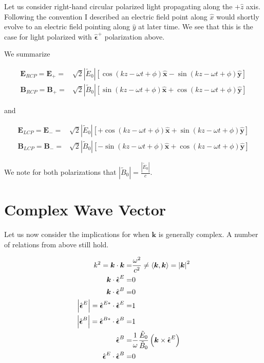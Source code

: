 \documentclass[12pt]{article}
\newcommand{\ep}{\epsilon}
\renewcommand{\vec}[1]{\boldsymbol{#1}}
\newcommand{\unitvec}[1]{\hat{\boldsymbol{#1}}}
\begin{document}
Let us consider right-hand circular polarized light propagating along the $+\hat{z}$ axis.
Following the convention I described an electric field point along $\hat{x}$ would shortly evolve to an electric field pointing along $\hat{y}$ at later time.
We see that this is the case for light polarized with $\unitvec{\ep}^+$ polarization above.

We summarize

\begin{align}
\vec{E}_{RCP} = \vec{E}_+ =& \sqrt{2}|\tilde{E}_0|\left[\cos(kz-\omega t + \phi) \unitvec{x} - \sin(kz-\omega t + \phi)\unitvec{y}\right]\\
\vec{B}_{RCP} = \vec{B}_+ =& \sqrt{2}|\tilde{B}_0|\left[\sin(kz-\omega t + \phi) \unitvec{x} + \cos(kz-\omega t + \phi)\unitvec{y}\right]
\end{align}

and

\begin{align}
\vec{E}_{LCP} = \vec{E}_- =& \sqrt{2}|\tilde{E}_0|\left[+\cos(kz-\omega t + \phi) \unitvec{x} + \sin(kz-\omega t + \phi)\unitvec{y}\right]\\
\vec{B}_{LCP} = \vec{B}_- =& \sqrt{2}|\tilde{B}_0|\left[-\sin(kz-\omega t + \phi) \unitvec{x} + \cos(kz-\omega t + \phi)\unitvec{y}\right]
\end{align}

We note for both polarizations that $|\tilde{B}_0| = \frac{|\tilde{E}_0|}{c}$.

\section{Complex Wave Vector}

Let us now consider the implications for when $\vec{k}$ is generally complex.
A number of relations from above still hold.

\begin{align}
k^2 = \vec{k}\cdot \vec{k} =& \frac{\omega^2}{c^2} \neq \Braket{\vec{k},\vec{k}} = \left|\vec{k}\right|^2\\
\vec{k}\cdot\unitvec{\ep}^E =&0\\
\vec{k}\cdot\unitvec{\ep}^B =&0\\
\left|\unitvec{\ep}^E\right| = \unitvec{\ep}^{E*}\cdot\unitvec{\ep}^E =&1\\
\left|\unitvec{\ep}^B\right| = \unitvec{\ep}^{B*}\cdot\unitvec{\ep}^B =&1\\
\unitvec{\ep}^B =& \frac{1}{\omega}\frac{\tilde{E}_0}{\tilde{B}_0} \left(\vec{k}\times \unitvec{\ep}^E\right)\\
\unitvec{\ep}^E\cdot\unitvec{\ep}^B =&0
\end{align}
\end{document}
